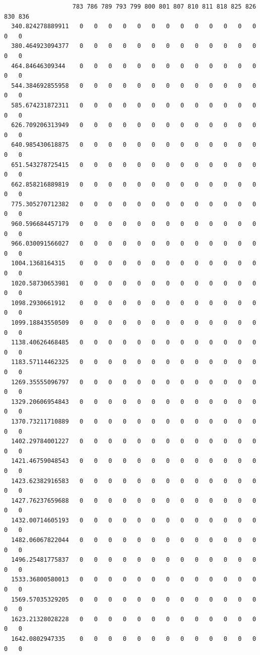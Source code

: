 \documentclass[
  letterpaper,
  DIV=11,
  numbers=noendperiod]{scrartcl}
\begin{document}
\begin{verbatim}
                   783 786 789 793 799 800 801 807 810 811 818 825 826 830 836
  340.824278889911   0   0   0   0   0   0   0   0   0   0   0   0   0   0   0
  380.464923094377   0   0   0   0   0   0   0   0   0   0   0   0   0   0   0
  464.84646309344    0   0   0   0   0   0   0   0   0   0   0   0   0   0   0
  544.384692855958   0   0   0   0   0   0   0   0   0   0   0   0   0   0   0
  585.674231872311   0   0   0   0   0   0   0   0   0   0   0   0   0   0   0
  626.709206313949   0   0   0   0   0   0   0   0   0   0   0   0   0   0   0
  640.985430618875   0   0   0   0   0   0   0   0   0   0   0   0   0   0   0
  651.543278725415   0   0   0   0   0   0   0   0   0   0   0   0   0   0   0
  662.858216889819   0   0   0   0   0   0   0   0   0   0   0   0   0   0   0
  775.305270712382   0   0   0   0   0   0   0   0   0   0   0   0   0   0   0
  960.596684457179   0   0   0   0   0   0   0   0   0   0   0   0   0   0   0
  966.030091566027   0   0   0   0   0   0   0   0   0   0   0   0   0   0   0
  1004.1368164315    0   0   0   0   0   0   0   0   0   0   0   0   0   0   0
  1020.58730653981   0   0   0   0   0   0   0   0   0   0   0   0   0   0   0
  1098.2930661912    0   0   0   0   0   0   0   0   0   0   0   0   0   0   0
  1099.18843550509   0   0   0   0   0   0   0   0   0   0   0   0   0   0   0
  1138.40626468485   0   0   0   0   0   0   0   0   0   0   0   0   0   0   0
  1183.57114462325   0   0   0   0   0   0   0   0   0   0   0   0   0   0   0
  1269.35555096797   0   0   0   0   0   0   0   0   0   0   0   0   0   0   0
  1329.20606954843   0   0   0   0   0   0   0   0   0   0   0   0   0   0   0
  1370.73211710889   0   0   0   0   0   0   0   0   0   0   0   0   0   0   0
  1402.29784001227   0   0   0   0   0   0   0   0   0   0   0   0   0   0   0
  1421.46759048543   0   0   0   0   0   0   0   0   0   0   0   0   0   0   0
  1423.62382916583   0   0   0   0   0   0   0   0   0   0   0   0   0   0   0
  1427.76237659688   0   0   0   0   0   0   0   0   0   0   0   0   0   0   0
  1432.00714605193   0   0   0   0   0   0   0   0   0   0   0   0   0   0   0
  1482.06067822044   0   0   0   0   0   0   0   0   0   0   0   0   0   0   0
  1496.25481775837   0   0   0   0   0   0   0   0   0   0   0   0   0   0   0
  1533.36800580013   0   0   0   0   0   0   0   0   0   0   0   0   0   0   0
  1569.57035329205   0   0   0   0   0   0   0   0   0   0   0   0   0   0   0
  1623.21328028228   0   0   0   0   0   0   0   0   0   0   0   0   0   0   0
  1642.0802947335    0   0   0   0   0   0   0   0   0   0   0   0   0   0   0

\end{verbatim}
\end{document}

